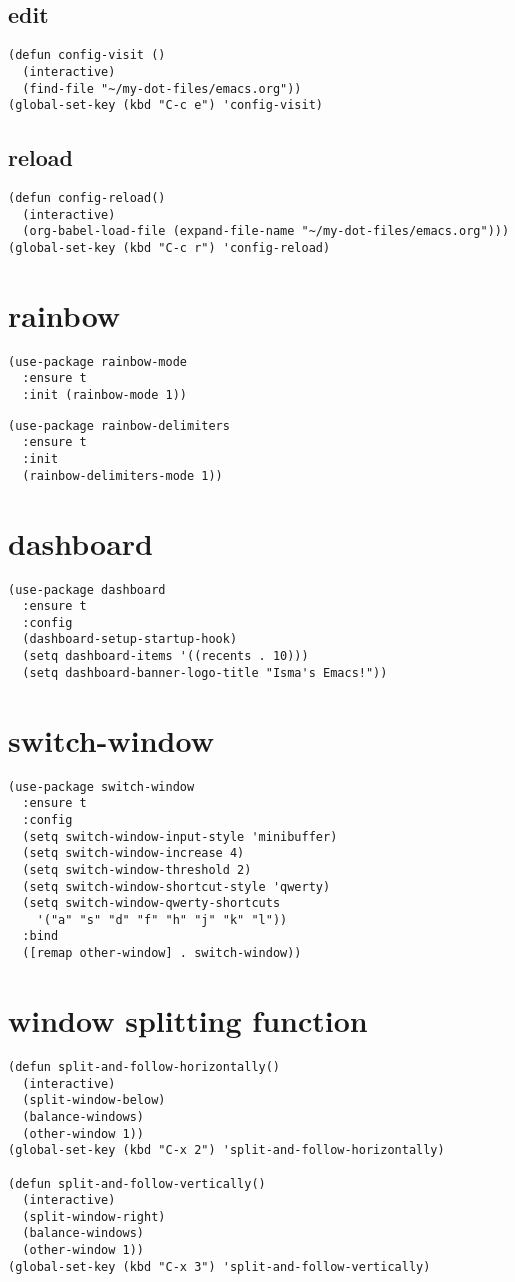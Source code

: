 \documentclass[11pt]{article}
\begin{document}
\subsection{edit}
\label{sec-9-1}
\begin{verbatim}
(defun config-visit ()
  (interactive)
  (find-file "~/my-dot-files/emacs.org"))
(global-set-key (kbd "C-c e") 'config-visit)
\end{verbatim}
\subsection{reload}
\label{sec-9-2}
\begin{verbatim}
(defun config-reload()
  (interactive)
  (org-babel-load-file (expand-file-name "~/my-dot-files/emacs.org")))
(global-set-key (kbd "C-c r") 'config-reload)
\end{verbatim}
\section{rainbow}
\label{sec-10}
\begin{verbatim}
(use-package rainbow-mode
  :ensure t
  :init (rainbow-mode 1))
\end{verbatim}
\begin{verbatim}
(use-package rainbow-delimiters
  :ensure t
  :init
  (rainbow-delimiters-mode 1))
\end{verbatim}
\section{dashboard}
\label{sec-11}
\begin{verbatim}
(use-package dashboard
  :ensure t
  :config
  (dashboard-setup-startup-hook)
  (setq dashboard-items '((recents . 10)))
  (setq dashboard-banner-logo-title "Isma's Emacs!"))
\end{verbatim}
\section{switch-window}
\label{sec-12}
\begin{verbatim}
(use-package switch-window
  :ensure t
  :config
  (setq switch-window-input-style 'minibuffer)
  (setq switch-window-increase 4)
  (setq switch-window-threshold 2)
  (setq switch-window-shortcut-style 'qwerty)
  (setq switch-window-qwerty-shortcuts
	'("a" "s" "d" "f" "h" "j" "k" "l"))
  :bind
  ([remap other-window] . switch-window))
\end{verbatim}
\section{window splitting function}
\label{sec-13}
\begin{verbatim}
(defun split-and-follow-horizontally()
  (interactive)
  (split-window-below)
  (balance-windows)
  (other-window 1))
(global-set-key (kbd "C-x 2") 'split-and-follow-horizontally)

(defun split-and-follow-vertically()
  (interactive)
  (split-window-right)
  (balance-windows)
  (other-window 1))
(global-set-key (kbd "C-x 3") 'split-and-follow-vertically)
\end{verbatim}
\end{document}
